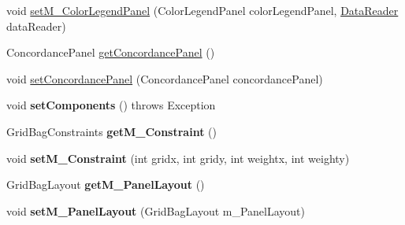 \begin{DoxyCompactItemize}
void \hyperlink{classtranslation_visualization_1_1_translation_visualization_aa101a9495f44afc16f938cf13a6f2e24}{set\+M\+\_\+\+Color\+Legend\+Panel} (Color\+Legend\+Panel color\+Legend\+Panel, \hyperlink{classtranslation_visualization_1_1_data_reader}{Data\+Reader} data\+Reader)
\item 
Concordance\+Panel \hyperlink{classtranslation_visualization_1_1_translation_visualization_ada19dca9e30dcb62a0bff2b6c2d2e4e7}{get\+Concordance\+Panel} ()
\item 
void \hyperlink{classtranslation_visualization_1_1_translation_visualization_a55a90cd2c358d5bb4e3a6197180f9a21}{set\+Concordance\+Panel} (Concordance\+Panel concordance\+Panel)
\item 
\mbox{\label{classtranslation_visualization_1_1_translation_visualization_a8ca9cdde4b9cc671e37467d8ad37e089}} 
void {\bfseries set\+Components} ()  throws Exception 
\item 
\mbox{\label{classtranslation_visualization_1_1_translation_visualization_a70bb294ec142a9e3d2c3ff8be2dff597}} 
Grid\+Bag\+Constraints {\bfseries get\+M\+\_\+\+Constraint} ()
\item 
\mbox{\label{classtranslation_visualization_1_1_translation_visualization_ae9d30e6e792e39ca6c71803864324602}} 
void {\bfseries set\+M\+\_\+\+Constraint} (int gridx, int gridy, int weightx, int weighty)
\item 
\mbox{\label{classtranslation_visualization_1_1_translation_visualization_af7bdd0a31d42d8ff3b6635273272eeaf}} 
Grid\+Bag\+Layout {\bfseries get\+M\+\_\+\+Panel\+Layout} ()
\item 
\mbox{\label{classtranslation_visualization_1_1_translation_visualization_a32b219727c16edd968323bea9e5c1ac1}} 
void {\bfseries set\+M\+\_\+\+Panel\+Layout} (Grid\+Bag\+Layout m\+\_\+\+Panel\+Layout)
\item 
\mbox{\label{classtranslation_visualization_1_1_translation_visualization_afecb35a905797e63be4b194eb7485341}} 

\end{DoxyCompactItemize}
